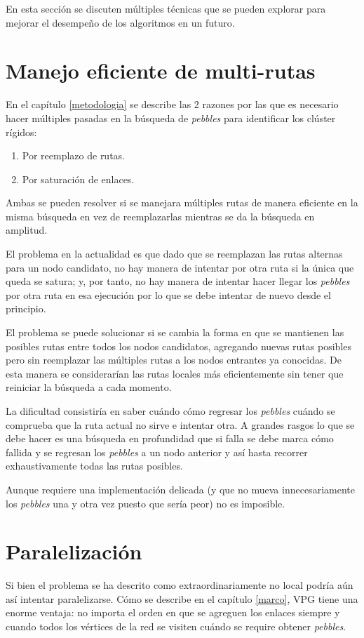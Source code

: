 En esta sección se discuten múltiples técnicas que se pueden explorar para mejorar el desempeño de los algoritmos en un futuro.

\section{Manejo eficiente de multi-rutas} \label{multi-rutas}
En el capítulo \ref{metodologia} se describe las 2 razones por las que es necesario hacer múltiples pasadas en la búsqueda de \emph{pebbles} para identificar los clúster rígidos:

\begin{enumerate}
	\item Por reemplazo de rutas.
	\item Por saturación de enlaces.
\end{enumerate}

Ambas se pueden resolver si se manejara múltiples rutas de manera eficiente en la misma búsqueda en vez de reemplazarlas mientras se da la búsqueda en amplitud. 

El problema en la actualidad es que dado que se reemplazan las rutas alternas para un nodo candidato, no hay manera de intentar por otra ruta si la única que queda se satura; y, por tanto, no hay manera de intentar hacer llegar los \emph{pebbles} por otra ruta en esa ejecución por lo que se debe intentar de nuevo desde el principio.

El problema se puede solucionar si se cambia la forma en que se mantienen las posibles rutas entre todos los nodos candidatos, agregando nuevas rutas posibles pero sin reemplazar las múltiples rutas a los nodos entrantes ya conocidas. De esta manera se considerarían las rutas locales más eficientemente sin tener que reiniciar la búsqueda a cada momento.

La dificultad consistiría en saber cuándo cómo regresar los \emph{pebbles} cuándo se comprueba que la ruta actual no sirve e intentar otra. A grandes rasgos lo que se debe hacer es una búsqueda en profundidad que si falla se debe marca cómo fallida y se regresan los \emph{pebbles} a un nodo anterior y así hasta recorrer exhaustivamente todas las rutas posibles.

Aunque requiere una implementación delicada (y que no mueva innecesariamente los \emph{pebbles} una y otra vez puesto que sería peor) no es imposible.

\section{Paralelización}
Si bien el problema se ha descrito como extraordinariamente no local podría aún así intentar paralelizarse. Cómo se describe en el capítulo \ref{marco}, VPG tiene una enorme ventaja: no importa el orden en que se agreguen los enlaces siempre y cuando todos los vértices de la red se visiten cuándo se require obtener \emph{pebbles}.

